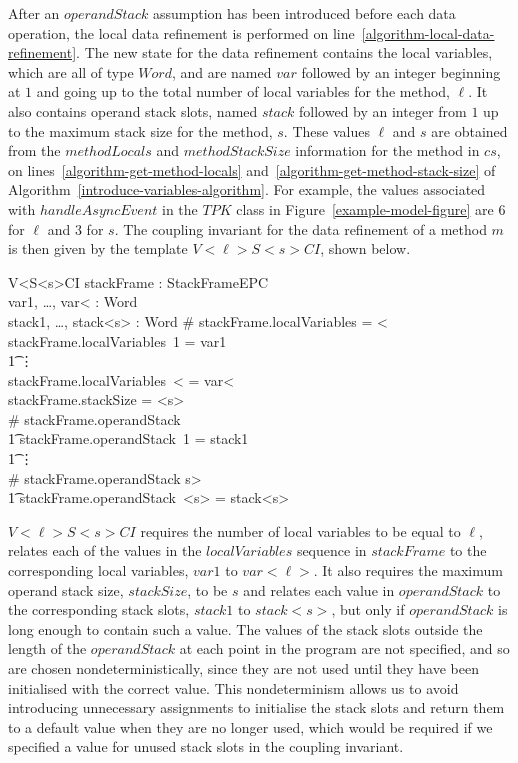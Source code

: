 After an $operandStack$ assumption has been introduced before each
data operation, the local data refinement is performed on
line~\ref{algorithm-local-data-refinement}.
The new state for the data refinement contains the local variables,
which are all of type $Word$, and are named $var$ followed by an
integer beginning at $1$ and going up to the total number of local
variables for the method, $\ell$.
It also contains operand stack slots, named $stack$ followed by an
integer from $1$ up to the maximum stack size for the method, $s$.
These values $\ell$ and $s$ are obtained from the $methodLocals$ and
$methodStackSize$ information for the method in $cs$, on
lines~\ref{algorithm-get-method-locals}
and~\ref{algorithm-get-method-stack-size} of
Algorithm~\ref{introduce-variables-algorithm}.
For example, the values associated with $handleAsyncEvent$ in the
$TPK$ class in Figure~\ref{example-model-figure} are $6$ for $\ell$
and $3$ for $s$. 
The coupling invariant for the data refinement of a method $m$ is then
given by the template $V{<}\ell{>}S{<}s{>}CI$, shown below.

\begin{schema}{V{<}\ell{>}S{<}s{>}CI}
  stackFrame : StackFrameEPC \\
  var1, \ldots, var{<}\ell{>} : Word \\
  stack1, \ldots, stack{<}s{>} : Word
\where
  \# stackFrame.localVariables = {<}\ell{>} \\
  stackFrame.localVariables~1 = var1 \\
  \t1 \vdots \\
  stackFrame.localVariables~{<}\ell{>} = var{<}\ell{>} \\
  stackFrame.stackSize = {<}s{>} \\
  \# stackFrame.operandStack  \implies \\
  \t1 stackFrame.operandStack~1 = stack1 \\
  \t1 \vdots \\
  \# stackFrame.operandStack \geq {<}s{>} \implies \\
  \t1 stackFrame.operandStack~{<}s{>} = stack{<}s{>}
\end{schema}

$V{<}\ell{>}S{<}s{>}CI$ requires the number of local variables to be
equal to $\ell$, relates each of the values in the $localVariables$
sequence in $stackFrame$ to the corresponding local variables, $var1$
to $var{<}\ell{>}$.
It also requires the maximum operand stack size, $stackSize$, to be
$s$ and relates each value in $operandStack$ to the corresponding
stack slots, $stack1$ to $stack{<}s{>}$, but only if $operandStack$ is
long enough to contain such a value.
The values of the stack slots outside the length of the $operandStack$
at each point in the program are not specified, and so are chosen
nondeterministically, since they are not used until they have been
initialised with the correct value.
This nondeterminism allows us to avoid introducing unnecessary
assignments to initialise the stack slots and return them to a default
value when they are no longer used, which would be required if we
specified a value for unused stack slots in the coupling invariant.

